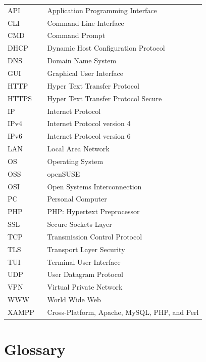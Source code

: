 \documentclass[11pt,a4paper]{report}
\begin{document}
    \begin{flushleft}
        \begin{tabular}{l p{0.8\linewidth}}
            API     & Application Programming Interface\\
            CLI     & Command Line Interface\\
            CMD     & Command Prompt\\
            DHCP    & Dynamic Host Configuration Protocol\\
            DNS     & Domain Name System\\
            GUI     & Graphical User Interface\\
            HTTP    & Hyper Text Transfer Protocol\\
            HTTPS   & Hyper Text Transfer Protocol Secure\\
            IP      & Internet Protocol\\
            IPv4    & Internet Protocol version 4\\
            IPv6    & Internet Protocol version 6\\
            LAN     & Local Area Network\\
            OS      & Operating System\\
            OSS     & openSUSE\\
            OSI     & Open Systems Interconnection\\
            PC      & Personal Computer\\
            PHP     & PHP: Hypertext Preprocessor\\
            SSL     & Secure Sockets Layer\\
            TCP     & Transmission Control Protocol\\
            TLS     & Transport Layer Security\\
            TUI     & Terminal User Interface\\ %
            UDP     & User Datagram Protocol\\
            VPN     & Virtual Private Network\\
            WWW     & World Wide Web\\
            XAMPP   & Cross-Platform, Apache, MySQL, PHP, and Perl
        \end{tabular}
    \end{flushleft}

\chapter*{Glossary}
\end{document}
